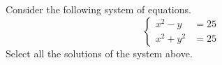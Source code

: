 \documentclass{ximera}
\author{Kenneth Berglund}
\begin{document}
\licenseSZ
\begin{exercise}
Consider the following system of equations.
$$
\begin{cases}
x^2 - y & = 25 \\
x^2 + y^2 & = 25
\end{cases}
$$
Select all the solutions of the system above.
\begin{selectAll}
\end{selectAll}

\end{exercise}
\end{document}
